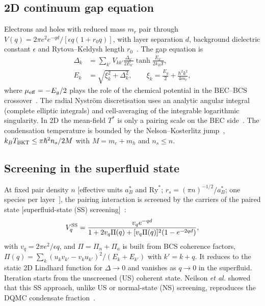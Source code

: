 \documentclass[aip,jap,reprint,amsmath,amssymb]{revtex4-2}
\begin{document}
\subsection{2D continuum gap equation}
Electrons and holes with reduced mass $m_r$ pair through
$V(q)=2\pi e^2 e^{-qd}/[\epsilon q(1+r_0q)]$, with layer separation $d$, background dielectric constant
$\epsilon$ and Rytova--Keldysh length $r_0$~\cite{Berkelbach2013}. The gap equation is
\begin{equation}
\begin{aligned}
\Delta_k&=\sum_{k'}V_{kk'}\frac{\Delta_{k'}}{2E_{k'}}\tanh\frac{E_{k'}}{2k_BT},\\
E_k&=\sqrt{\xi_k^2+\Delta_k^2},\qquad \xi_k=\frac{E_g}{2}+\frac{\hbar^2k^2}{4m_r},
\end{aligned}
\label{eq:gap}
\end{equation}
where $\mu_{\rm eff}=-E_g/2$ plays the role of the chemical potential in the BEC--BCS crossover~\cite{Randeria2014}.
The radial Nystr\"om discretisation uses an analytic angular integral (complete elliptic integrals) and
cell-averaging of the integrable logarithmic singularity. In 2D the mean-field $T^*$ is only a pairing scale on the
BEC side~\cite{Randeria2014}. The condensation temperature is bounded by the Nelson--Kosterlitz
jump~\cite{NelsonKosterlitz1977}, $k_BT_{\rm BKT}\le \pi\hbar^2 n_s/2M$ with $M=m_e+m_h$ and $n_s\le n$.

\subsection{Screening in the superfluid state}
At fixed pair density $n$ [effective units $a_B^*$ and $\mathrm{Ry}^*$; $r_s=(\pi n)^{-1/2}/a_B^*$; one species per layer~\cite{Pieri2007}],
the pairing interaction is screened by the carriers of the paired state [superfluid-state (SS) screening]~\cite{Neilson2014}:
\begin{equation}
V^{\rm SS}_q=\frac{v_q e^{-qd}}{1+2v_q\Pi(q)+[v_q\Pi(q)]^2(1-e^{-2qd})},
\label{eq:ss}
\end{equation}
with $v_q=2\pi e^2/\epsilon q$,
and $\Pi=\Pi_n+\Pi_a$ is built from BCS coherence factors,
$\Pi(q)=\sum_k(u_kv_{k'}-v_ku_{k'})^2/(E_k+E_{k'})$ with $k'=k+q$. It reduces to the static 2D Lindhard function for $\Delta\to0$ and
vanishes as $q\to0$ in the superfluid. Iteration starts from the unscreened (US) coherent state. Neilson \textit{et al.} showed that this SS approach, unlike US or normal-state (NS) screening, reproduces the DQMC condensate fraction~\cite{Neilson2014}.
\end{document}

